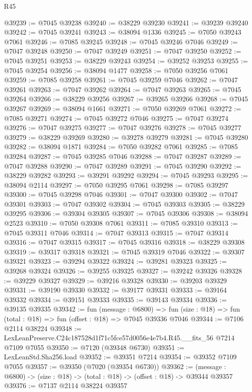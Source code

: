 \begin{lexlean}{R45}
\begin{coremodule}
{@39239 := @7045 @39238
@39240 := @38229 @39230
@39241 := @39239 @39240
@39242 := @7045 @39241
@39243 := @38094 @1336
@39245 := @7050 @39243 @7061
@39246 := @7085 @39245
@39248 := @7045 @39246 @7046
@39249 := @7047 @39248
@39250 := @7047 @39249
@39251 := @7047 @39250
@39252 := @7045 @39251
@39253 := @38229 @39243
@39254 := @39252 @39253
@39255 := @7045 @39254
@39256 := @38094 @1477
@39258 := @7050 @39256 @7061
@39259 := @7085 @39258
@39261 := @7045 @39259 @7046
@39262 := @7047 @39261
@39263 := @7047 @39262
@39264 := @7047 @39263
@39265 := @7045 @39264
@39266 := @38229 @39256
@39267 := @39265 @39266
@39268 := @7045 @39267
@39269 := @38094 @1661
@39271 := @7050 @39269 @7061
@39272 := @7085 @39271
@39274 := @7045 @39272 @7046
@39275 := @7047 @39274
@39276 := @7047 @39275
@39277 := @7047 @39276
@39278 := @7045 @39277
@39279 := @38229 @39269
@39280 := @39278 @39279
@39281 := @7045 @39280
@39282 := @38094 @1871
@39284 := @7050 @39282 @7061
@39285 := @7085 @39284
@39287 := @7045 @39285 @7046
@39288 := @7047 @39287
@39289 := @7047 @39288
@39290 := @7047 @39289
@39291 := @7045 @39290
@39292 := @38229 @39282
@39293 := @39291 @39292
@39294 := @7045 @39293
@39295 := @38094 @2114
@39297 := @7050 @39295 @7061
@39298 := @7085 @39297
@39300 := @7045 @39298 @7046
@39301 := @7047 @39300
@39302 := @7047 @39301
@39303 := @7047 @39302
@39304 := @7045 @39303
@39305 := @38229 @39295
@39306 := @39304 @39305
@39307 := @7045 @39306
@39308 := @38094 @2523
@39310 := @7050 @39308 @7061
@39311 := @7085 @39310
@39313 := @7045 @39311 @7046
@39314 := @7047 @39313
@39315 := @7047 @39314
@39316 := @7047 @39315
@39317 := @7045 @39316
@39318 := @38229 @39308
@39319 := @39317 @39318
@39321 := @7045 @39319 @7046
@39322 := @39307 @39321
@39323 := @39294 @39322
@39324 := @39281 @39323
@39325 := @39268 @39324
@39326 := @39255 @39325
@39327 := @39242 @39326
@39328 := @39229 @39327
@39329 := @39216 @39328
@39330 := @39203 @39329
@39331 := @39190 @39330
@39332 := @39177 @39331
@39333 := @39164 @39332
@39334 := @39151 @39333
@39335 := @39143 @39334
@39336 := @39135 @39335
@39342 := fun (message : @6800) =>
  fun (size : @18) => fun (total : @18) => fun (offset : @18) => @7045 @39336 @7046
@39344 := @7106 @2114 @38224
@39348 := LexLeanPreserve.C24c187528d1f71c5fce57d0056e4e7b4.R45.__fits_56 @7214 @7109 @7055
@39350 := @7120 (@39348 @6730)
@39351 := LexLeanStd.Sha256.load
@39352 := @39351 @7214
@39354 := @39352 @7109 @7055
@39357 := @39350 (@7020 (@39354 @6730))
@39362 := (message : @6800) -> (size : @18) -> (total : @18) -> (offset : @18) -> @39344 @39357
@39376 := @7137
    @2114
    @38224
    @39357
}
\end{coremodule}
\end{lexlean}
